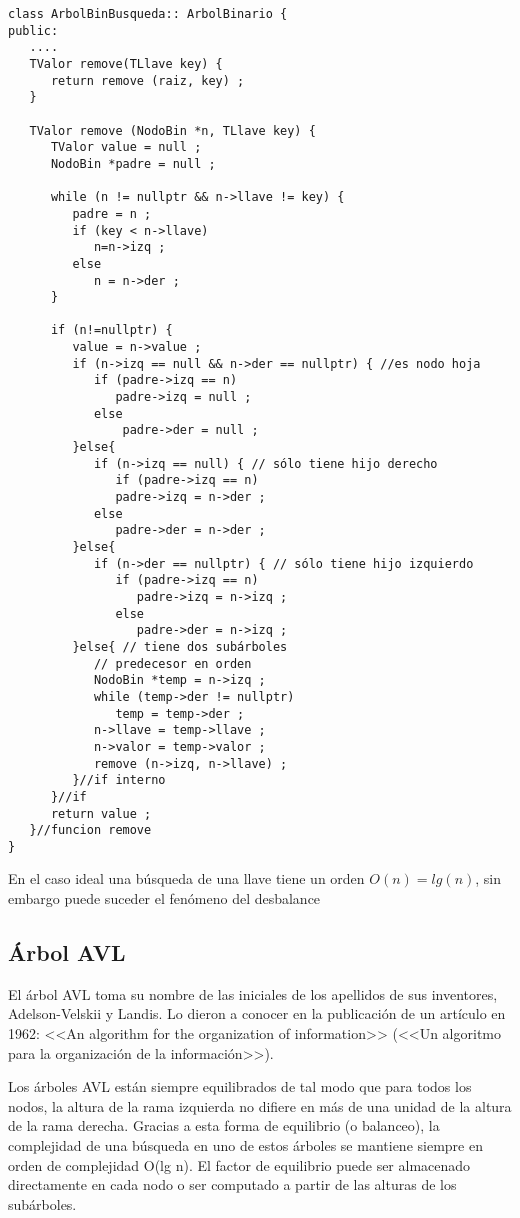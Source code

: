 \begin{verbatim}
class ArbolBinBusqueda:: ArbolBinario {
public:
   ....
   TValor remove(TLlave key) {
      return remove (raiz, key) ;
   }

   TValor remove (NodoBin *n, TLlave key) {
      TValor value = null ;
      NodoBin *padre = null ;

      while (n != nullptr && n->llave != key) {
         padre = n ;
         if (key < n->llave)
            n=n->izq ;
         else
            n = n->der ;
      }

      if (n!=nullptr) {
         value = n->value ;
         if (n->izq == null && n->der == nullptr) { //es nodo hoja
            if (padre->izq == n)
               padre->izq = null ;
            else
                padre->der = null ;
         }else{
            if (n->izq == null) { // sólo tiene hijo derecho
               if (padre->izq == n)
               padre->izq = n->der ;
            else
               padre->der = n->der ;
         }else{
            if (n->der == nullptr) { // sólo tiene hijo izquierdo
               if (padre->izq == n)
                  padre->izq = n->izq ;
               else
                  padre->der = n->izq ;
         }else{ // tiene dos subárboles
            // predecesor en orden
            NodoBin *temp = n->izq ;
            while (temp->der != nullptr)
               temp = temp->der ;
            n->llave = temp->llave ;
            n->valor = temp->valor ;
            remove (n->izq, n->llave) ;
         }//if interno
      }//if
      return value ;
   }//funcion remove
}
\end{verbatim}

En el caso ideal una búsqueda de una llave tiene un orden $O(n)=lg (n)$,
sin embargo puede suceder el fenómeno del desbalance

\subsection{Árbol AVL}
\label{sec:arbol-avl}

El árbol AVL toma su nombre de las iniciales de los apellidos de sus
inventores, Adelson-Velskii y Landis. Lo dieron a conocer en la
publicación de un artículo en 1962: <<An algorithm for the organization
of information>> (<<Un algoritmo para la organización de la
información>>).

Los árboles AVL están siempre equilibrados de tal modo que para todos
los nodos, la altura de la rama izquierda no difiere en más de una
unidad de la altura de la rama derecha. Gracias a esta forma de
equilibrio (o balanceo), la complejidad de una búsqueda en uno de
estos árboles se mantiene siempre en orden de complejidad O(lg n). El
factor de equilibrio puede ser almacenado directamente en cada nodo o
ser computado a partir de las alturas de los subárboles.

